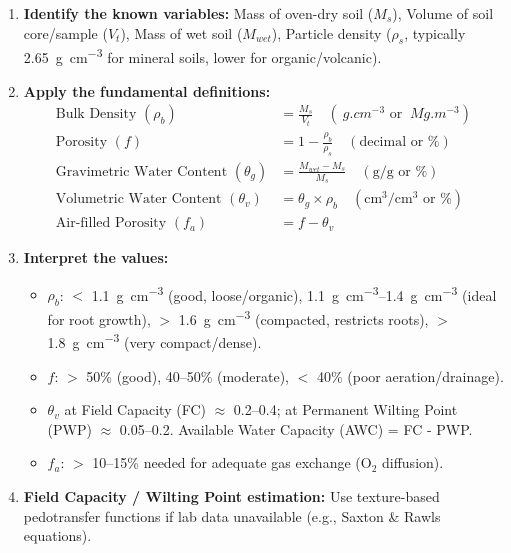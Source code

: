 \documentclass[11pt]{article}
\begin{document}
\begin{methode}
\begin{enumerate}
\item \textbf{Identify the known variables:} Mass of oven-dry soil ($M_s$), Volume of soil core/sample ($V_t$), Mass of wet soil ($M_{wet}$), Particle density ($\rho_s$, typically \SI{2.65}{g.cm^{-3}} for mineral soils, lower for organic/volcanic).
\item \textbf{Apply the fundamental definitions:}
      \begin{align*}
      \text{Bulk Density } (\rho_b) &= \frac{M_s}{V_t} \quad (\SI{}{g.cm^{-3}} \text{ or } \SI{}{Mg.m^{-3}}) \\
      \text{Porosity } (f) &= 1 - \frac{\rho_b}{\rho_s} \quad (\text{decimal or \%}) \\
      \text{Gravimetric Water Content } (\theta_g) &= \frac{M_{wet} - M_s}{M_s} \quad (\text{g/g or \%}) \\
      \text{Volumetric Water Content } (\theta_v) &= \theta_g \times \rho_b \quad (\text{cm}^3/\text{cm}^3 \text{ or \%}) \\
      \text{Air-filled Porosity } (f_a) &= f - \theta_v
      \end{align*}
\item \textbf{Interpret the values:}
      \begin{itemize}
      \item $\rho_b$: $<$ \SI{1.1}{g.cm^{-3}} (good, loose/organic), \SI{1.1}{g.cm^{-3}}--\SI{1.4}{g.cm^{-3}} (ideal for root growth), $>$ \SI{1.6}{g.cm^{-3}} (compacted, restricts roots), $>$ \SI{1.8}{g.cm^{-3}} (very compact/dense).
      \item $f$: $>$ 50\% (good), 40--50\% (moderate), $<$ 40\% (poor aeration/drainage).
      \item $\theta_v$ at Field Capacity (FC) $\approx$ 0.2--0.4; at Permanent Wilting Point (PWP) $\approx$ 0.05--0.2. Available Water Capacity (AWC) = FC - PWP.
      \item $f_a$: $>$ 10--15\% needed for adequate gas exchange (O$_2$ diffusion).
      \end{itemize}
\item \textbf{Field Capacity / Wilting Point estimation:} Use texture-based pedotransfer functions if lab data unavailable (e.g., Saxton \& Rawls equations).
\end{enumerate}
\end{methode}
\end{document}
